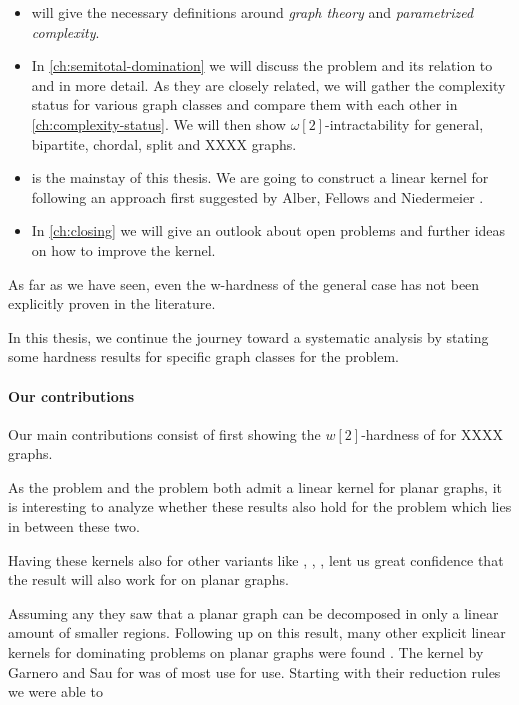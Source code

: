 \begin{itemize}
    \item {} will give the necessary definitions around \textit{graph theory} and \textit{parametrized complexity}.
    \item In \cref{ch:semitotal-domination} we will discuss the \sdom problem and its relation to \dom and \tdom in more detail. As they are closely related, we will gather the complexity status for various graph classes and compare them with each other in \cref{ch:complexity-status}. We will then show $\omega[2]$-intractability for general, bipartite, chordal, split and XXXX graphs.
    \item {} is the mainstay of this thesis. We are going to construct a linear kernel for \psdom following an approach first suggested by Alber, Fellows and Niedermeier \cite{Alber2004}. 
    \item In \cref{ch:closing} we will give an outlook about open problems and further ideas on how to improve the kernel.

\end{itemize}

As far as we have seen, even the w-hardness of the general case has not been explicitly proven in the literature. 

In this thesis, we continue the journey toward a systematic analysis by stating some hardness results for specific graph classes for the problem.

\paragraph{Our contributions}

Our main contributions consist of first showing the $w[2]$-hardness of \sdom for XXXX graphs.

\noindent As the \dom problem and the \tdom problem both admit a linear kernel for planar graphs, it is interesting to analyze whether these results also hold for the \sdom problem which lies in between these two. 

Having these kernels also for other variants like \eddom, \efdom, \cdom, \rbdom lent us great confidence that the result will also work for \sdom on planar graphs.


Assuming any \dom they saw that a planar graph can be decomposed in only a linear amount of smaller regions.
Following up on this result, many other explicit linear kernels for dominating problems on planar graphs were found \cite{Guo2007, Garnero2017, Luo2013, Alber2006}. The kernel by Garnero and Sau \cite{Garnero2018} for \ptdom was of most use for use. Starting with their reduction rules we were able to 

